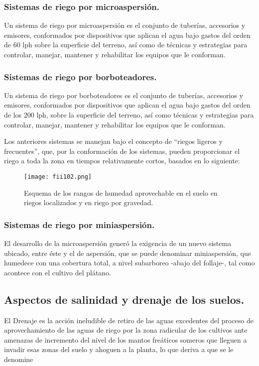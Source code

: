 \subsubsection{Sistemas de riego por microaspersión.}
Un sistema de riego por microaspersión es el conjunto de tuberías, accesorios y
emisores, conformados por dispositivos que aplican el agua bajo gastos del orden de 60
lph sobre la superficie del terreno, así como de técnicas y estrategias para controlar,
manejar, mantener y rehabilitar los equipos que le conforman.

\subsubsection{Sistemas de riego por borboteadores.}
Un sistema de riego por borboteadores es el conjunto de tuberías, accesorios y
emisores, conformados por dispositivos que aplican el agua bajo gastos del orden de
los 200 lph, sobre la superficie del terreno, así como técnicas y estrategias para
controlar, manejar, mantener y rehabilitar los equipos que le conforman.


Los anteriores sistemas se manejan bajo el concepto de ``riegos ligeros y
frecuentes'', que, por la conformación de los sistemas, pueden proporcionar el riego a
toda la zona en tiempos relativamente cortos, basados en lo siguiente:

\begin{figure}[h!]
	\centerline{\texttt{[image: fii102.png]}}
	\caption{Esquema de los rangos de humedad aprovechable en el suelo en
		riegos localizados y en riego por gravedad.}
	\label{fii102}
\end{figure}

\subsubsection{Sistemas de riego por miniaspersión.}
El desarrollo de la microaspersión generó la exigencia de un nuevo sistema
ubicado, entre éste y el de aspersión, que se puede denominar miniaspersión, que
humedece con una cobertura total, a nivel subarboreo -abajo del follaje-, tal como
acontece con el cultivo del plátano.


\subsection{Aspectos de salinidad y drenaje de los suelos.}
El Drenaje es la acción ineludible de retiro de las aguas excedentes del proceso
de aprovechamiento de las aguas de riego por la zona radicular de los cultivos ante
amenazas de incremento del nivel de los mantos freáticos someros que lleguen a
invadir esas zonas del suelo y ahoguen a la planta, lo que deriva a que se le denomine


